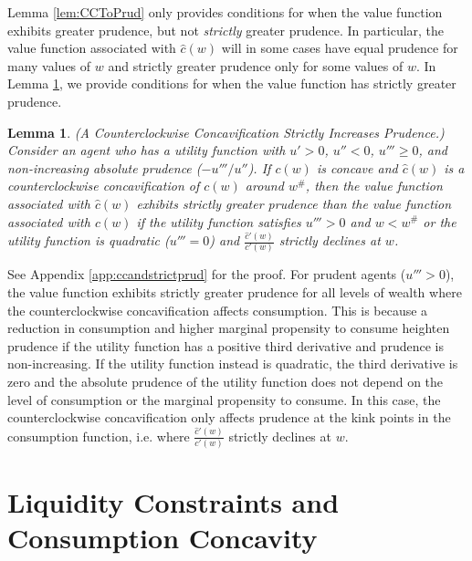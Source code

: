 \documentclass[titlepage]{\econtex}
\newtheorem{lemma}{Lemma}
\begin{document}
  Lemma \ref{lem:CCToPrud} only provides conditions for when the value function exhibits greater prudence, but not \textit{strictly} greater prudence. In particular, the value function associated with $\hat{c}(w)$ will in some cases have equal prudence for many values of $w$ and strictly greater prudence only for some values of $w$. In Lemma \ref{lem:ccandstrictprud}, we provide conditions for when the value function has strictly greater prudence.

  \begin{lemma} \label{lem:ccandstrictprud}(A Counterclockwise Concavification Strictly Increases Prudence.)\\
    Consider an agent who has a utility function with $u' > 0$, $u'' < 0$, $u''' \geq 0$, and non-increasing absolute prudence ($-u'''/u''$). If $c(w)$ is concave and $\hat{c}(w)$ is a counterclockwise concavification of $c(w)$ around $w^{\#}$, then the value function associated with $\hat{c}(w)$ exhibits strictly greater prudence than the value function associated with $c(w)$ if the utility function satisfies $u''' > 0$ and $w < w^{\#}$ or the utility function is quadratic ($u''' = 0$) and $\frac{\hat{c}'(w)}{c'(w)}$ strictly declines at $w$.
  \end{lemma}
  \noindent See Appendix \ref{app:ccandstrictprud} for the proof. For prudent agents ($u''' > 0$), the value function exhibits strictly greater prudence for all levels of wealth where the counterclockwise concavification affects consumption. This is because a reduction in consumption and higher marginal propensity to consume heighten prudence if the utility function has a positive third derivative and prudence is non-increasing. If the utility function instead is quadratic, the third derivative is zero and the absolute prudence of the utility function does not depend on the level of consumption or the marginal propensity to consume. In this case, the counterclockwise concavification only affects prudence at the kink points in the consumption function, i.e. where $\frac{\hat{c}'(w)}{c'(w)}$ strictly declines at $w$.




\section{Liquidity Constraints and Consumption Concavity}\label{sec:LCandCC} 
\end{document}
